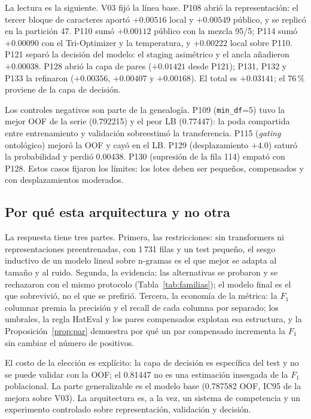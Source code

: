 La lectura es la siguiente. V03 fijó la línea base. P108 abrió la
representación: el tercer bloque de caracteres aportó $+0.00516$ local y
$+0.00549$ público, y se replicó en la partición 47. P110 sumó $+0.00112$
público con la mezcla 95/5; P114 sumó $+0.00090$ con el Tri-Optimizer y la
temperatura, y $+0.00222$ local sobre P110. P121 separó la decisión del modelo:
el staging asimétrico y el ancla añadieron $+0.00038$. P128 abrió la capa de
pares ($+0.01421$ desde P121); P131, P132 y P133 la refinaron ($+0.00356$,
$+0.00407$ y $+0.00168$). El total es $+0.03141$; el 76\,\% proviene de la capa
de decisión.

Los controles negativos son parte de la genealogía. P109 (\texttt{min\_df}=5)
tuvo la mejor OOF de la serie (0.792215) y el peor LB (0.77447): la poda
compartida entre entrenamiento y validación sobreestimó la transferencia. P115
(\emph{gating} ontológico) mejoró la OOF y cayó en el LB. P129 (desplazamiento
$+4.0$) saturó la probabilidad y perdió 0.00438. P130 (supresión de la fila
114) empató con P128. Estos casos fijaron los límites: los lotes deben ser
pequeños, compensados y con desplazamientos moderados.

\subsection{Por qué esta arquitectura y no otra}

La respuesta tiene tres partes. Primera, las restricciones: sin transformers ni
representaciones preentrenadas, con 1\,731 filas y un test pequeño, el sesgo
inductivo de un modelo lineal sobre n-gramas es el que mejor se adapta al
tamaño y al ruido. Segunda, la evidencia: las alternativas se probaron y se
rechazaron con el mismo protocolo (Tabla~\ref{tab:familias}); el modelo final
es el que sobrevivió, no el que se prefirió. Tercera, la economía de la
métrica: la $F_1$ columnar premia la precisión y el recall de cada columna por
separado; los umbrales, la regla HatEval y los pares compensados explotan esa
estructura, y la Proposición~\ref{prop:par} demuestra por qué un par compensado
incrementa la $F_1$ sin cambiar el número de positivos.

El costo de la elección es explícito: la capa de decisión es específica del
test y no se puede validar con la OOF; el 0.81447 no es una estimación
insesgada de la $F_1$ poblacional. La parte generalizable es el modelo base
(0.787582 OOF, IC95 de la mejora sobre V03). La arquitectura es, a la vez, un
sistema de competencia y un experimento controlado sobre representación,
validación y decisión.


